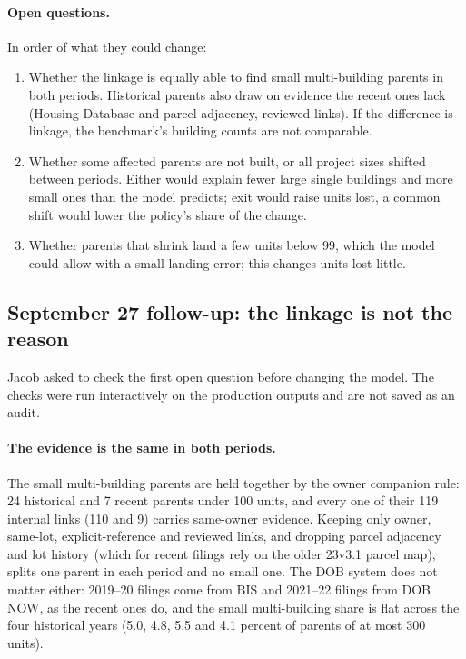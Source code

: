 \paragraph{Open questions.} In order of what they could change:
\begin{enumerate}
\item Whether the linkage is equally able to find small multi-building
parents in both periods. Historical parents also draw on evidence the recent
ones lack (Housing Database and parcel adjacency, reviewed links). If the
difference is linkage, the benchmark's building counts are not comparable.
\item Whether some affected parents are not built, or all project sizes
shifted between periods. Either would explain fewer large single buildings and
more small ones than the model predicts; exit would raise units lost, a common
shift would lower the policy's share of the change.
\item Whether parents that shrink land a few units below 99, which the model
could allow with a small landing error; this changes units lost little.
\end{enumerate}

\subsection*{September 27 follow-up: the linkage is not the reason}

Jacob asked to check the first open question before changing the model. The
checks were run interactively on the production outputs and are not saved as
an audit.

\paragraph{The evidence is the same in both periods.} The small multi-building
parents are held together by the owner companion rule: 24 historical and 7
recent parents under 100 units, and every one of their 119 internal links (110 and
9) carries same-owner evidence. Keeping only owner, same-lot, explicit-reference and
reviewed links, and dropping parcel adjacency and lot history (which for recent
filings rely on the older 23v3.1 parcel map), splits one parent in each period
and no small one. The DOB system does not matter either: 2019--20 filings come
from BIS and 2021--22 filings from DOB NOW, as the recent ones do, and the
small multi-building share is flat across the four historical years (5.0, 4.8,
5.5 and 4.1 percent of parents of at most 300 units).

